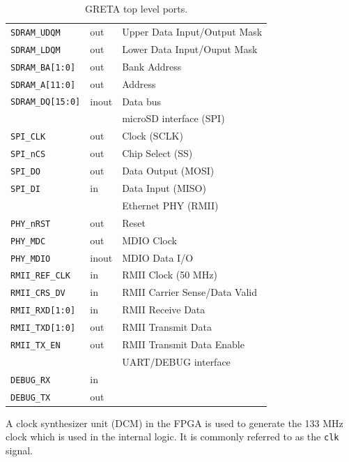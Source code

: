 \documentclass[a4paper]{report}
\begin{document}
\begin{table}
\begin{tabular}{*3l}
\texttt{SDRAM\_UDQM}        & out   & Upper Data Input/Output Mask \\
\texttt{SDRAM\_LDQM}        & out   & Lower Data Input/Ouput Mask \\
\texttt{SDRAM\_BA[1:0]}     & out   & Bank Address \\
\texttt{SDRAM\_A[11:0]}     & out   & Address \\
\texttt{SDRAM\_DQ[15:0]}    & inout & Data bus \\
\midrule
\midrule
                    &       & microSD interface (SPI) \\
\midrule
\texttt{SPI\_CLK}   & out   & Clock (SCLK) \\
\texttt{SPI\_nCS}   & out   & Chip Select (SS) \\
\texttt{SPI\_DO}    & out   & Data Output (MOSI) \\
\texttt{SPI\_DI}    & in    & Data Input (MISO)\\
\midrule
\midrule
                        &       & Ethernet PHY (RMII) \\
\midrule
\texttt{PHY\_nRST}      & out   & Reset \\
\texttt{PHY\_MDC}       & out   & MDIO Clock \\
\texttt{PHY\_MDIO}      & inout & MDIO Data I/O \\
\texttt{RMII\_REF\_CLK} & in    & RMII Clock (50 MHz) \\
\texttt{RMII\_CRS\_DV}  & in    & RMII Carrier Sense/Data Valid \\
\texttt{RMII\_RXD[1:0]} & in    & RMII Receive Data \\
\texttt{RMII\_TXD[1:0]} & out   & RMII Transmit Data \\
\texttt{RMII\_TX\_EN}   & out   & RMII Transmit Data Enable \\
\midrule
\midrule
                    &       & UART/DEBUG interface \\
\midrule
\texttt{DEBUG\_RX}  & in    & \\
\texttt{DEBUG\_TX}  & out   & \\
\midrule
\bottomrule
 \hline
\end{tabular}
\caption{GRETA top level ports.}
\label{top_level}
\end{table}

A clock synthesizer unit (DCM) in the FPGA is used to generate
the 133 MHz clock which is used in the internal logic. It is
commonly referred to as the \texttt{clk} signal.
\end{document}

